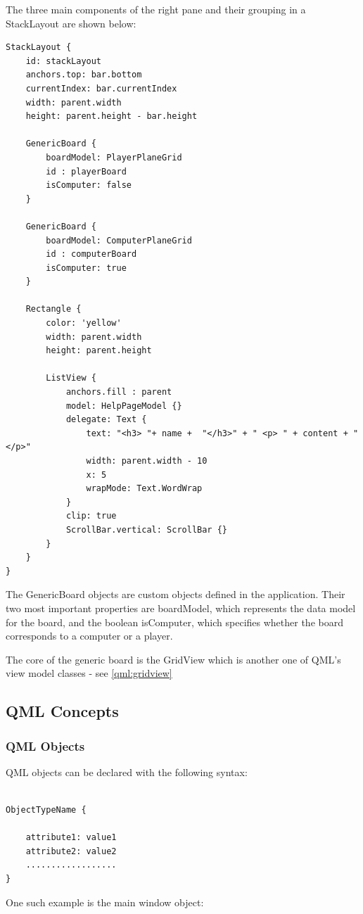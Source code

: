 The three main components of the right pane and their grouping in a StackLayout are shown below:

\begin{lstlisting}
StackLayout {
	id: stackLayout
	anchors.top: bar.bottom
	currentIndex: bar.currentIndex
	width: parent.width
	height: parent.height - bar.height
	
	GenericBoard {
		boardModel: PlayerPlaneGrid
		id : playerBoard
		isComputer: false
	}
	
	GenericBoard {
		boardModel: ComputerPlaneGrid
		id : computerBoard
		isComputer: true
	}
	
	Rectangle {
		color: 'yellow'
		width: parent.width
		height: parent.height
		
		ListView {
			anchors.fill : parent 
			model: HelpPageModel {}
			delegate: Text {
				text: "<h3> "+ name +  "</h3>" + " <p> " + content + " </p>"
				width: parent.width - 10
				x: 5
				wrapMode: Text.WordWrap
			}
			clip: true
			ScrollBar.vertical: ScrollBar {}
		}
	}
}
\end{lstlisting}

The GenericBoard objects are custom objects defined in the application. Their two most important properties are boardModel, which represents the data model for the board, and the boolean isComputer, which specifies whether the board corresponds to a computer or a player.

The core of the generic board is the GridView which is another one of QML's view model classes - see \ref{qml:gridview}

\subsection {QML Concepts}

\subsubsection {QML Objects}

QML objects can be declared with the following syntax: 

\begin{lstlisting}

ObjectTypeName {

	attribute1: value1
	attribute2: value2
	..................
}

\end{lstlisting}

One such example is the main window object:

